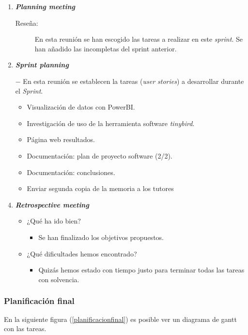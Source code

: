 \begin{enumerate}
	\item \textbf{\textit{Planning meeting}}
	\begin{description}
		\item[Reseña:] En esta reunión se han escogido las tareas a realizar en este \textit{sprint}. Se han añadido las incompletas del sprint anterior.
	\end{description}
	\item \textbf{\textit{Sprint planning}}
	\item[$-$] En esta reunión se establecen la tareas (\textit{user stories}) a desarrollar durante el \textit{Sprint}. 
	\begin{itemize}
		\item Visualización de datos con PowerBI.
		\item Investigación de uso de la herramienta software \textit{tinybird}.
		\item Página web resultados.
		\item Documentación: plan de proyecto software (2/2).
		\item Documentación: conclusiones.
		\item Enviar segunda copia de la memoria a los tutores
	\end{itemize}
	\item \textbf{\textit{Retrospective meeting}}
	\begin{itemize}
		\item ¿Qué ha ido bien?
		\begin{itemize}
		\item Se han finalizado los objetivos propuestos.
		\end{itemize}
		\item ¿Qué dificultades hemos encontrado?
		\begin{itemize}
		\item Quizás hemos estado con tiempo justo para terminar todas las tareas con solvencia.
		\end{itemize}
	\end{itemize}	
\end{enumerate}

\subsubsection{Planificación final}

En la siguiente figura (\ref{planificacionfinal}) es posible ver un diagrama de gantt con las tareas.

